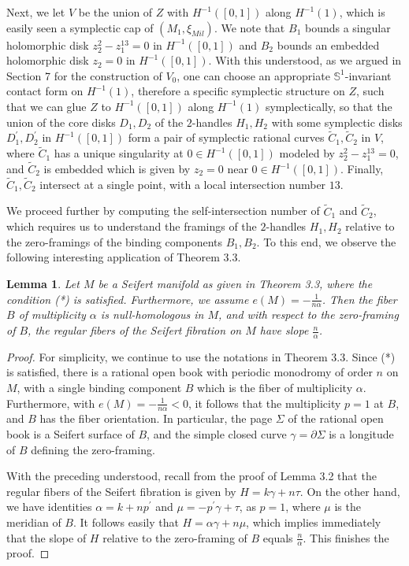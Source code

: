 \documentclass[11pt]{amsart}
\theoremstyle{plain}
\numberwithin{theorem}{section}
\newtheorem{lemma}[theorem]{Lemma}
\theoremstyle{definition}
\newcommand{\s}{{\mathbb S}}
\begin{document}
Next, we let $V$ be the union of $Z$ with $H^{-1}([0,1])$ along $H^{-1}(1)$, which is easily seen
a symplectic cap of $(M_1,\xi_{Mil})$. We note that $B_1$ bounds a singular holomorphic disk 
$z_2^2-z_1^{13}=0$ in $H^{-1}([0,1])$ and $B_2$ bounds an embedded holomorphic disk $z_2=0$
in $H^{-1}([0,1])$. With this understood, as we argued  in Section 7 for the construction of $V_0$,
one can choose an appropriate $\s^1$-invariant contact form on $H^{-1}(1)$, therefore a specific
symplectic structure on $Z$, such that we can glue $Z$ to $H^{-1}([0,1])$ along $H^{-1}(1)$ 
symplectically, so that the union of the core disks $D_1,D_2$ of the $2$-handles $H_1,H_2$ with 
some symplectic disks $D_1^\prime,D_2^\prime$ in $H^{-1}([0,1])$ form a pair of symplectic 
rational curves $\tilde{C}_1,\tilde{C}_2$ in $V$, where $\tilde{C}_1$ has a unique singularity at
$0\in H^{-1}([0,1])$ modeled by $z_2^2-z_1^{13}=0$, and $\tilde{C}_2$ is embedded 
which is given by $z_2=0$ near $0\in H^{-1}([0,1])$. Finally, $\tilde{C}_1,\tilde{C}_2$ intersect at 
a single point, with a local intersection number $13$. 

We proceed further by computing the self-intersection number of $\tilde{C}_1$ and $\tilde{C}_2$, which
requires us to understand the framings of the $2$-handles $H_1,H_2$ relative to the zero-framings of
the binding components $B_1,B_2$. To this end, we observe the following interesting application of Theorem 3.3.

\begin{lemma}
Let $M$ be a Seifert manifold as given in Theorem 3.3, where the condition (*) is satisfied. Furthermore, we assume $e(M)=-\frac{1}{n\alpha}$. Then the fiber $B$ of multiplicity $\alpha$ 
is null-homologous in $M$, and with respect to the zero-framing of $B$, the regular fibers of the
Seifert fibration on $M$ have slope $\frac{n}{\alpha}$. 
\end{lemma}

\begin{proof}
For simplicity, we continue to use the notations in Theorem 3.3. Since (*) is satisfied, there is a
rational open book with periodic monodromy of order $n$ on $M$, with a single binding component 
$B$ which is the fiber of multiplicity $\alpha$. Furthermore, with $e(M)=-\frac{1}{n\alpha}<0$,
it follows that the multiplicity $p=1$ at $B$, and $B$ has the fiber orientation. In particular, the page
$\Sigma$ of the rational open book is a Seifert surface of $B$, and the simple closed curve
$\gamma=\partial \Sigma$ is a longitude of $B$ defining the zero-framing. 

With the preceding understood, recall from the proof of Lemma 3.2 that the regular fibers of the
Seifert fibration is given by $H=k\gamma+n\tau$. On the other hand, we have identities 
$\alpha=k+np^\prime$ and $\mu=-p^\prime \gamma+\tau$, as $p=1$, where $\mu$ is the meridian
of $B$. It follows easily that $H=\alpha\gamma+n \mu$, which implies immediately that the slope
of $H$ relative to the zero-framing of $B$ equals $\frac{n}{\alpha}$. This finishes the proof. 

\end{proof}
\end{document}

